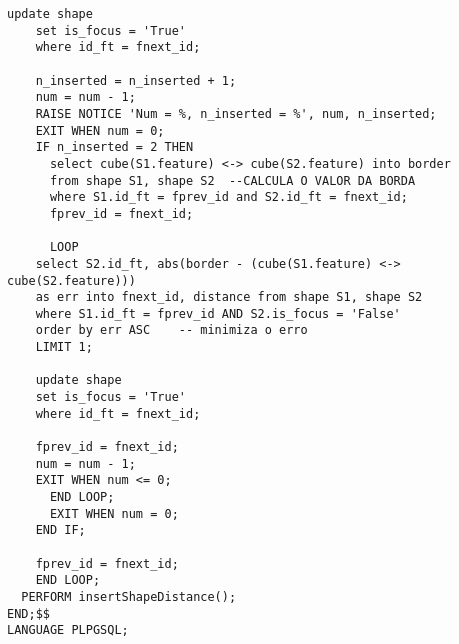 \begin{apendicesenv}
\begin{lstlisting}[caption={Criação da base focal OMNI}, captionpos=t,basicstyle=\tiny]
    update shape
    set is_focus = 'True'
    where id_ft = fnext_id;

    n_inserted = n_inserted + 1;
    num = num - 1;
    RAISE NOTICE 'Num = %, n_inserted = %', num, n_inserted;
    EXIT WHEN num = 0;
    IF n_inserted = 2 THEN
      select cube(S1.feature) <-> cube(S2.feature) into border 
      from shape S1, shape S2  --CALCULA O VALOR DA BORDA
      where S1.id_ft = fprev_id and S2.id_ft = fnext_id;
      fprev_id = fnext_id;

      LOOP					
	select S2.id_ft, abs(border - (cube(S1.feature) <-> cube(S2.feature))) 
	as err into fnext_id, distance from shape S1, shape S2
	where S1.id_ft = fprev_id AND S2.is_focus = 'False'
	order by err ASC	-- minimiza o erro
	LIMIT 1;

	update shape
	set is_focus = 'True'
	where id_ft = fnext_id;

	fprev_id = fnext_id;					
	num = num - 1;
	EXIT WHEN num <= 0;
      END LOOP;
      EXIT WHEN num = 0;
    END IF;

    fprev_id = fnext_id;
    END LOOP;
  PERFORM insertShapeDistance();
END;$$
LANGUAGE PLPGSQL;
\end{lstlisting}


\end{apendicesenv}
